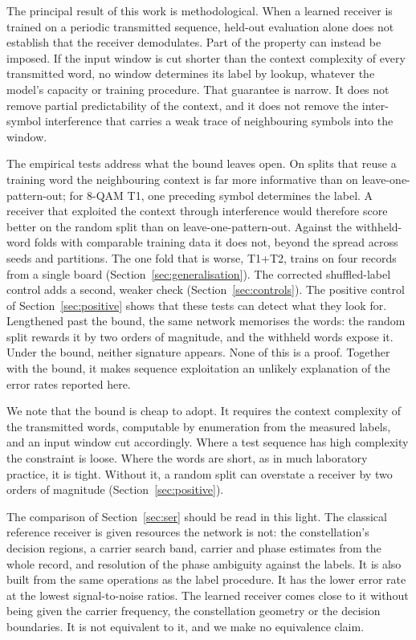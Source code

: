 \documentclass{ieeeaccess}
\begin{document}
The principal result of this work is methodological. When a learned receiver is
trained on a periodic transmitted sequence, held-out evaluation alone does not
establish that the receiver demodulates. Part of the property can instead be
imposed. If the input window is cut shorter than the context complexity of
every transmitted word, no window determines its label by lookup, whatever the
model's capacity or training procedure. That guarantee is narrow. It does not
remove partial predictability of the context, and it does not remove the
inter-symbol interference that carries a weak trace of neighbouring symbols
into the window.

The empirical tests address what the bound leaves open. On splits that reuse a
training word the neighbouring context is far more informative than on
leave-one-pattern-out; for 8-QAM T1, one preceding symbol determines the label.
A receiver that exploited the context through interference would therefore
score better on the random split than on leave-one-pattern-out. Against the
withheld-word folds with comparable training data it does not, beyond the
spread across seeds and partitions. The one fold that is worse, T1+T2, trains
on four records from a single board (Section~\ref{sec:generalisation}).
The corrected shuffled-label control adds a second, weaker check
(Section~\ref{sec:controls}). The positive control of
Section~\ref{sec:positive} shows that these tests can detect what they look
for. Lengthened past the bound, the same network memorises the words: the
random split rewards it by two orders of magnitude, and the withheld words
expose it. Under the bound, neither signature appears. None of this is a
proof. Together with the bound, it makes sequence exploitation an unlikely
explanation of the error rates reported here.

We note that the bound is cheap to adopt. It requires the context complexity of
the transmitted words, computable by enumeration from the measured labels, and
an input window cut accordingly. Where a test sequence has high complexity the
constraint is loose. Where the words are short, as in much laboratory practice,
it is tight. Without it, a random split can overstate a receiver by two orders
of magnitude (Section~\ref{sec:positive}).

The comparison of Section~\ref{sec:ser} should be read in this light. The
classical reference receiver is given resources the network is not: the
constellation's decision regions, a carrier search band, carrier and phase
estimates from the whole record, and resolution of the phase ambiguity against
the labels. It is also built from the same operations as the label procedure.
It has the lower error rate at the lowest signal-to-noise ratios. The learned
receiver comes close to it without being given the carrier frequency, the
constellation geometry or the decision boundaries. It is not equivalent to it,
and we make no equivalence claim.
\end{document}
